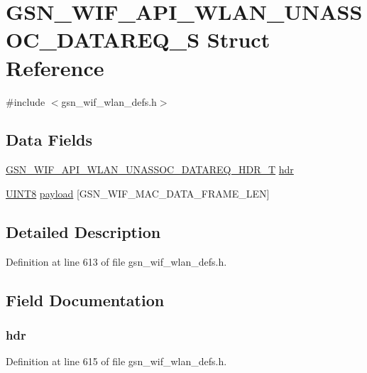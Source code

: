 \hypertarget{a00315}{
\section{GSN\_\-WIF\_\-API\_\-WLAN\_\-UNASSOC\_\-DATAREQ\_\-S Struct Reference}
\label{a00315}
}


{\ttfamily \#include $<$gsn\_\-wif\_\-wlan\_\-defs.h$>$}

\subsection*{Data Fields}
\begin{DoxyCompactItemize}
\item 
\hyperlink{a00314}{GSN\_\-WIF\_\-API\_\-WLAN\_\-UNASSOC\_\-DATAREQ\_\-HDR\_\-T} \hyperlink{a00315_a09fa29b22e5095fccb039ae78f219a1c}{hdr}
\item 
\hyperlink{a00660_gab27e9918b538ce9d8ca692479b375b6a}{UINT8} \hyperlink{a00315_a70bbc91720090e476964a75df3a83fd3}{payload} \mbox{[}GSN\_\-WIF\_\-MAC\_\-DATA\_\-FRAME\_\-LEN\mbox{]}
\end{DoxyCompactItemize}


\subsection{Detailed Description}


Definition at line 613 of file gsn\_\-wif\_\-wlan\_\-defs.h.



\subsection{Field Documentation}
\hypertarget{a00315_a09fa29b22e5095fccb039ae78f219a1c}{
\subsubsection[{hdr}]{ {\bf hdr}}}
\label{a00315_a09fa29b22e5095fccb039ae78f219a1c}


Definition at line 615 of file gsn\_\-wif\_\-wlan\_\-defs.h.

